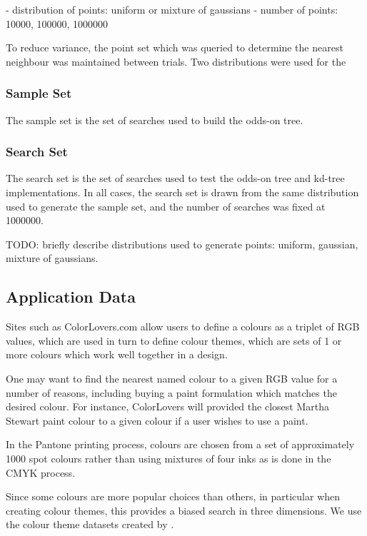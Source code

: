 \documentclass[mcs]{scsthesis}
\begin{document}
- distribution of points: uniform or mixture of gaussians
- number of points: 10000, 100000, 1000000 

To reduce variance, the point set which was queried to determine the nearest
neighbour was maintained between trials.  Two distributions were used for the

\subsubsection{Sample Set}

The sample set is the set of searches used to build the odds-on tree.

\subsubsection{Search Set}

The search set is the set of searches used to  test the odds-on tree and
kd-tree implementations.  In all cases, the search set is drawn from the same
distribution used to generate the sample set, and the number of searches was
fixed at 1000000. 

TODO: briefly describe distributions used to generate points: uniform, gaussian,
mixture of gaussians.

\subsection{Application Data}

Sites such as ColorLovers.com \cite{colorlovers} allow users to define a
colours as a triplet of RGB values, which are used in turn to define colour
themes, which are sets of 1 or more colours which work well together in a
design.

One may want to find the nearest named colour to a given RGB value for
a number of reasons, including buying a paint formulation which matches the
desired colour.  For instance, ColorLovers will provided the closest Martha
Stewart paint colour to a given colour if a user wishes to use a paint.

In the Pantone \cite{pantone} printing process, colours are chosen from a set of
approximately 1000 spot colours rather than using mixtures of four inks as is
done in the CMYK process.

Since some colours are more popular choices than others, in particular when
creating colour themes, this provides a biased search in three dimensions. We
use the colour theme datasets created by \cite{colorthemes}.
\end{document}
